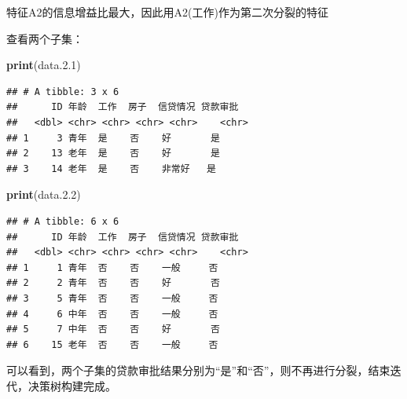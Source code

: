\documentclass[
]{ctexart}
\newenvironment{Shaded}{\begin{snugshade}}{\end{snugshade}}
\newcommand{\FloatTok}[1]{\textcolor[rgb]{0.00,0.00,0.81}{#1}}
\newcommand{\FunctionTok}[1]{\textcolor[rgb]{0.13,0.29,0.53}{\textbf{#1}}}
\newcommand{\NormalTok}[1]{#1}
\newcommand{\OtherTok}[1]{\textcolor[rgb]{0.56,0.35,0.01}{#1}}
\newcommand{\SpecialCharTok}[1]{\textcolor[rgb]{0.81,0.36,0.00}{\textbf{#1}}}
\newcommand{\StringTok}[1]{\textcolor[rgb]{0.31,0.60,0.02}{#1}}
\begin{document}
特征A2的信息增益比最大，因此用A2(工作)作为第二次分裂的特征

\begin{Shaded}
\end{Shaded}

查看两个子集：

\begin{Shaded}
\begin{Highlighting}[]
\FunctionTok{print}\NormalTok{(data.}\FloatTok{2.1}\NormalTok{)}
\end{Highlighting}
\end{Shaded}

\begin{verbatim}
## # A tibble: 3 x 6
##      ID 年龄  工作  房子  信贷情况 贷款审批
##   <dbl> <chr> <chr> <chr> <chr>    <chr>   
## 1     3 青年  是    否    好       是      
## 2    13 老年  是    否    好       是      
## 3    14 老年  是    否    非常好   是
\end{verbatim}

\begin{Shaded}
\begin{Highlighting}[]
\FunctionTok{print}\NormalTok{(data.}\FloatTok{2.2}\NormalTok{)}
\end{Highlighting}
\end{Shaded}

\begin{verbatim}
## # A tibble: 6 x 6
##      ID 年龄  工作  房子  信贷情况 贷款审批
##   <dbl> <chr> <chr> <chr> <chr>    <chr>   
## 1     1 青年  否    否    一般     否      
## 2     2 青年  否    否    好       否      
## 3     5 青年  否    否    一般     否      
## 4     6 中年  否    否    一般     否      
## 5     7 中年  否    否    好       否      
## 6    15 老年  否    否    一般     否
\end{verbatim}

可以看到，两个子集的贷款审批结果分别为``是''和``否''，则不再进行分裂，结束迭代，决策树构建完成。
\end{document}
